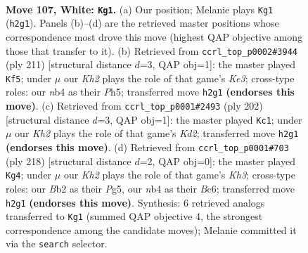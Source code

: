 \documentclass[11pt]{article}
\begin{document}
\clearpage

\begin{figure}[p]\centering
\begin{subfigure}{0.46\textwidth}\centering
\resizebox{\linewidth}{!}{%
\newchessgame
\chessboard[
  setfen={b7/8/8/7k/1n6/8/1B3P1K/8 w - - 59 107},
  showmover=false,
  pgfstyle=straightmove, color=movearrow, markmove={h2-g1}
]}
\caption{}
\end{subfigure}\hfill
\begin{subfigure}{0.46\textwidth}\centering
\resizebox{\linewidth}{!}{%
\newchessgame
\chessboard[
  setfen={8/1b6/4k3/7p/5p1B/8/8/6K1 b - - 59 106},
  showmover=false,
  pgfstyle=straightmove, color=movearrow, markmove={e6-f5}
]}
\caption{}
\end{subfigure}
\\[4pt]
\begin{subfigure}{0.46\textwidth}\centering
\resizebox{\linewidth}{!}{%
\newchessgame
\chessboard[
  setfen={6B1/8/8/7b/5k1P/8/3K4/8 w - - 7 102},
  showmover=false,
  pgfstyle=straightmove, color=movearrow, markmove={d2-c1}
]}
\caption{}
\end{subfigure}\hfill
\begin{subfigure}{0.46\textwidth}\centering
\resizebox{\linewidth}{!}{%
\newchessgame
\chessboard[
  setfen={5k2/8/2B5/5PP1/8/7K/8/b7 w - - 69 110},
  showmover=false,
  pgfstyle=straightmove, color=movearrow, markmove={h3-g4}
]}
\caption{}
\end{subfigure}
\caption{\textbf{Move 107, White: \texttt{Kg1}.} (a) Our position; Melanie plays \texttt{Kg1} (\texttt{h2g1}). Panels (b)--(d) are the retrieved master positions whose correspondence most drove this move (highest QAP objective among those that transfer to it). (b) Retrieved from \texttt{ccrl\_top\_p0002\#3944} (ply 211) [structural distance $d$=3, QAP obj=1]: the master played \texttt{Kf5}; under $\mu$ our \emph{Kh2} plays the role of that game's \emph{Ke3}; cross-type roles: our \emph{n}b4 as their \emph{P}h5; transferred move \texttt{h2g1} \textbf{(endorses this move)}. (c) Retrieved from \texttt{ccrl\_top\_p0001\#2493} (ply 202) [structural distance $d$=3, QAP obj=1]: the master played \texttt{Kc1}; under $\mu$ our \emph{Kh2} plays the role of that game's \emph{Kd2}; transferred move \texttt{h2g1} \textbf{(endorses this move)}. (d) Retrieved from \texttt{ccrl\_top\_p0001\#703} (ply 218) [structural distance $d$=2, QAP obj=0]: the master played \texttt{Kg4}; under $\mu$ our \emph{Kh2} plays the role of that game's \emph{Kh3}; cross-type roles: our \emph{B}b2 as their \emph{P}g5, our \emph{n}b4 as their \emph{B}c6; transferred move \texttt{h2g1} \textbf{(endorses this move)}. Synthesis: 6 retrieved analogs transferred to \texttt{Kg1} (summed QAP objective 4, the strongest correspondence among the candidate moves); Melanie committed it via the \texttt{search} selector.}
\label{fig:thought-m212}
\end{figure}
\end{document}

